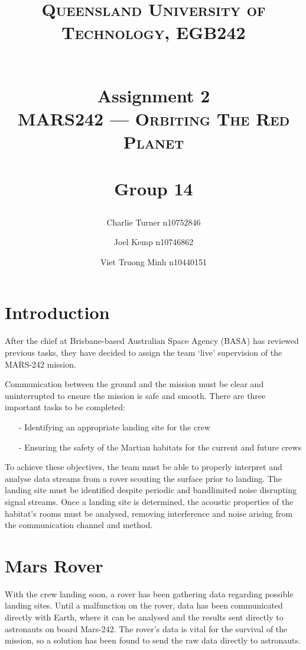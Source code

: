 \documentclass[12pt]{article}
\author{
    Charlie Turner \small n10752846 \and
    Joel Kemp \small n10746862 \and
    Viet Truong Minh \small n10440151
}
\title{
    \normalfont{} \normalsize{}
    \begin{flushleft}
        \textsc{Queensland University of Technology, EGB242} \\ [5pt]
    \end{flushleft}
    \horrule{0.5pt} \\[0.4cm]
    \huge Assignment 2 \\
    \large \textsc{MARS242 --- Orbiting The Red Planet}   \\ %
    \horrule{2pt} \\[0.2cm]
    \textbf{Group 14} \\
}
\numberwithin{equation}{section}
\numberwithin{figure}{section}
\numberwithin{table}{section}
\begin{document}
\begin{titlingpage}
    \maketitle
\end{titlingpage}

\section*{Introduction}

After the chief at Brisbane-based Australian Space Agency (BASA) has reviewed
previous tasks, they have decided to assign the team `live' supervision of the
MARS-242 mission.

Communication between the ground and the mission must be clear and
uninterrupted to ensure the mission is safe and smooth. There are three
important tasks to be completed:
\begin{itemize}
    \item[-] Identifying an appropriate landing site for the crew
    \item[-] Ensuring the safety of the Martian habitats for the current and future crews
\end{itemize}

To achieve these objectives, the team must be able to properly interpret and
analyse data streams from a rover scouting the surface prior to landing. The
landing site must be identified despite periodic and bandlimited noise
disrupting signal streams. Once a landing site is determined, the acoustic
properties of the habitat's rooms must be analysed, removing interference and
noise arising from the communication channel and method.

%
%
\section{Mars Rover}

With the crew landing soon, a rover has been gathering data regarding possible
landing sites. Until a malfunction on the rover, data has been communicated
directly with Earth, where it can be analysed and the results sent directly to
astronauts on board Mars-242. The rover's data is vital for the survival of the
mission, so a solution has been found to send the raw data directly to
astronauts.
\end{document}

